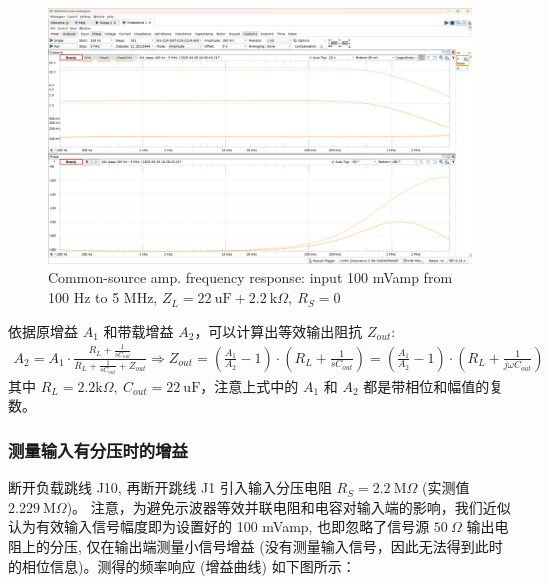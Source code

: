 \documentclass[UTF8]{article}
\begin{document}
\begin{figure}[H]\centering
    \includegraphics[width=\columnwidth]{LCE-04-场效应管/assets/cs amp/cs amp output impedance, R_L = 2k2 Ohm (input 100 mVamp, 100Hz ~ 5MHz).png}
    \caption{Common-source amp. frequency response: input 100 mVamp from 100 Hz to 5 MHz, $Z_L = 22 \ \mathrm{uF} + 2.2 \ \mathrm{k}\Omega,\ R_S = 0$}
\end{figure}

依据原增益 $A_1$ 和带载增益 $A_2$，可以计算出等效输出阻抗 $Z_{out}$:
\begin{gather}
\label{eq: Z_out}
A_2 = A_1 \cdot \frac{R_L + \frac{1}{sC_{out}}}{R_L + \frac{1}{sC_{out}} + Z_{out}} \Longrightarrow 
Z_{out} = \left(\frac{A_1}{A_2} - 1\right)\cdot \left(R_L + \frac{1}{sC_{out}}\right) = \left(\frac{A_1}{A_2} - 1\right)\cdot \left(R_L + \frac{1}{j\omega C_{out}}\right)
\end{gather}
其中 $R_L = 2.2\mathrm{k}\Omega,\ C_{out} = 22 \ \mathrm{uF}$，注意上式中的 $A_1$ 和 $A_2$ 都是带相位和幅值的复数。


\subsubsection{测量输入有分压时的增益}

断开负载跳线 J10, 再断开跳线 J1 引入输入分压电阻 $R_{S} = 2.2 \ \mathrm{M}\Omega$ (实测值 $2.229 \ \mathrm{M}\Omega$)。
注意，为避免示波器等效并联电阻和电容对输入端的影响，我们近似认为有效输入信号幅度即为设置好的 100 mVamp, 也即忽略了信号源 $50\ \Omega$ 输出电阻上的分压, 仅在输出端测量小信号增益 (没有测量输入信号，因此无法得到此时的相位信息)。测得的频率响应 (增益曲线) 如下图所示：
\end{document}
